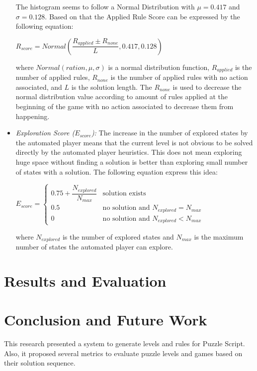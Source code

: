 \documentclass[letterpaper]{article}
\begin{document}
\begin{itemize}
	The histogram seems to follow a Normal Distribution with $\mu = 0.417$ and $\sigma = 0.128$. Based on that the Applied Rule Score can be expressed by the following equation:
	\begin{center}$R_{score} = Normal(\dfrac{R_{applied} \pm R_{none}}{L}, 0.417, 0.128)$\end{center}
	where $Normal(ration, \mu, \sigma)$ is a normal distribution function, $R_{applied}$ is the number of applied rules, $R_{none}$ is the number of applied rules with no action associated, and $L$ is the solution length. The $R_{none}$ is used to decrease the normal distribution value according to amount of rules applied at the beginning of the game with no action associated to decrease them from happening.
	
	\item \emph{Exploration Score ($E_{score}$):} The increase in the number of explored states by the automated player means that the current level is not obvious to be solved directly by the automated player heuristics. This does not mean exploring huge space without finding a solution is better than exploring small number of states with a solution. The following equation express this idea:
	\begin{center}
	$E_{score}= \begin{cases}
	               0.75 + \dfrac{N_{explored}}{N_{max}} & \text{solution exists}\\
	               0.5 & \text{no solution and }N_{explored} = N_{max}\\
	               0 & \text{no solution and }N_{explored} < N_{max}
	           \end{cases}$
	\end{center}
	where $N_{explored}$ is the number of explored states and $N_{max}$ is the maximum number of states the automated player can explore.
\end{itemize}

\section{Results and Evaluation}

\section{Conclusion and Future Work}
This research presented a system to generate levels and rules for Puzzle Script. Also, it proposed several metrics to evaluate puzzle levels and games based on their solution sequence.\\\par
\end{document}
